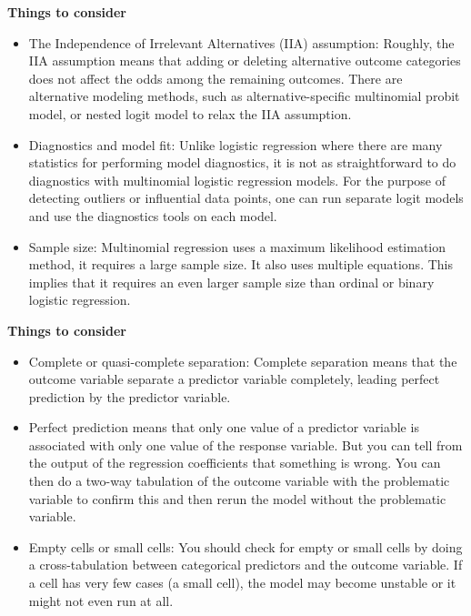 \begin{frame}[fragile] 
\textbf{Things to consider}
\begin{itemize}
\item The Independence of Irrelevant Alternatives (IIA) assumption: Roughly, the IIA assumption means that adding or deleting alternative outcome categories does not affect the odds among the remaining outcomes. There are alternative modeling methods, such as alternative-specific multinomial probit model, or nested logit model to relax the IIA assumption.
\item Diagnostics and model fit: Unlike logistic regression where there are many statistics for performing model diagnostics, it is not as straightforward to do diagnostics with multinomial logistic regression models. For the purpose of detecting outliers or influential data points, one can run separate logit models and use the diagnostics tools on each model. 
\item Sample size: Multinomial regression uses a maximum likelihood estimation method, it requires a large sample size. It also uses multiple equations. This implies that it requires an even larger sample size than ordinal or binary logistic regression.
\end{itemize}

\end{frame}
\begin{frame}[fragile] 
\textbf{Things to consider}
\begin{itemize}
\item Complete or quasi-complete separation: Complete separation means that the outcome variable separate a predictor variable completely, leading perfect prediction by the predictor variable.
\item Perfect prediction means that only one value of a predictor variable is associated with only one value of the response variable. But you can tell from the output of the regression coefficients that something is wrong. You can then do a two-way tabulation of the outcome variable with the problematic variable to confirm this and then rerun the model without the problematic variable.
\item Empty cells or small cells: You should check for empty or small cells by doing a cross-tabulation between categorical predictors and the outcome variable. If a cell has very few cases (a small cell), the model may become unstable or it might not even run at all.
\end{itemize}

\end{frame}
